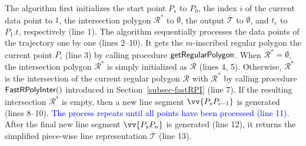 The algorithm first initializes the start point $P_s$ to $P_0$, the index $i$ of the current data point to $1$, the intersection polygon $\mathcal{R}^*$ to $\emptyset$, the output $\overline{\mathcal{T}}$ to $\emptyset$, and $t_c$ to $P_1.t$, respectively (line 1).
%
The algorithm sequentially processes the data points of the trajectory one by one  (lines 2--10). It gets the $m$-inscribed regular polygon \wrt the current point $P_i$ (line 3) by calling procedure ${\mathsf{getRegularPolygon}}$. When $\mathcal{R}^* = \emptyset$, the intersection polygon $\mathcal{R}^*$ is simply initialized as $\mathcal{R}$ (lines 4, 5). Otherwise,
$\mathcal{R}^*$ is  the intersection of the current regular polygon $\mathcal{R}$ with $\mathcal{R}^*$ by calling procedure ${\mathsf{FastRPolyInter}}()$ introduced in Section~\ref{subsec-fastRPI} (line 7). If the resulting intersection $\mathcal{R}^*$ is empty, then a new line segment $\vv{P_sP_{i-1}}$ is generated (lines 8--10). \textcolor{blue}{The process repeats until all points have been processed (line 11).}
After the  final new line segment $\vv{P_sP_{n}}$ is generated (line 12), it returns the simplified  piece-wise line representation $\overline{\mathcal{T}}$ (line 13).





